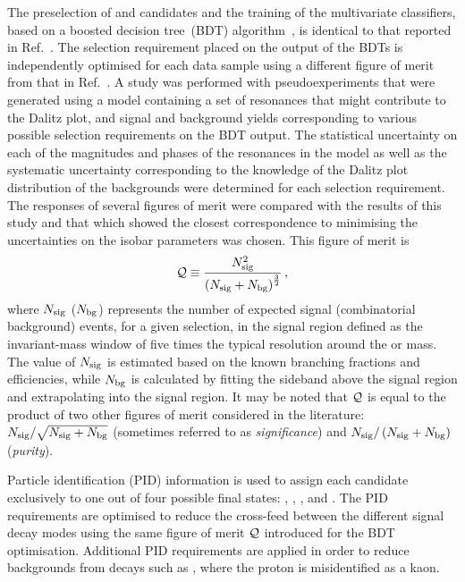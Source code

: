 The preselection of \KS and \B candidates and the training of the
multivariate classifiers, based on a boosted decision tree~(BDT)
algorithm~\cite{Breiman,AdaBoost}, is identical to that reported in
Ref.~\cite{LHCb-PAPER-2017-010}.
The selection requirement placed on the output of the BDTs is independently
optimised for each data sample using a different figure of merit from that in Ref.~\cite{LHCb-PAPER-2017-010}.
A study was performed with pseudoexperiments that were generated using a model containing a set of resonances that might contribute to the \BstoKsKPi Dalitz plot, and signal and background yields corresponding to various possible selection requirements on the BDT output.
The statistical uncertainty on each of the magnitudes and phases of the
resonances in the model as well as the systematic uncertainty
corresponding to the knowledge of the Dalitz plot distribution of the
backgrounds were determined for each selection requirement.
The responses of several figures of merit were compared with the results of
this study and that which showed the closest correspondence to minimising
the uncertainties on the isobar parameters was chosen.
This figure of merit is
%
\begin{equation}
{\cal Q} \equiv \frac{N^2_{\rm sig}}{\left(N_{\rm sig}+N_{\rm bg}\right)^\frac{3}{2}} \,,
\end{equation}
%
where $N_{\rm sig}$ ($N_{\rm bg}$) represents the number of expected signal
(combinatorial background) events, for a given selection, in the signal region
defined as the invariant-mass window of five times the typical resolution
around the \Bd or \Bs mass.
The value of $N_{\rm sig}$ is estimated based on the known branching
fractions and efficiencies, while $N_{\rm bg}$ is calculated by fitting the
sideband above the signal region and extrapolating into the signal region.
It may be noted that ${\cal Q}$ is equal to the product of two other figures of merit considered in the literature: $N_{\rm sig}/\sqrt{N_{\rm sig}+N_{\rm bg}}$ (sometimes referred to as {\it significance}) and $N_{\rm sig}/\left(N_{\rm sig}+N_{\rm bg}\right)$ ({\it purity}).

Particle identification (PID) information is used to assign
each candidate exclusively to one out of four possible final states:
\KsPiPi, \KsKpPim, \KsKmPip, and \KsKK.
The PID requirements are optimised to reduce the cross-feed between the
different signal decay modes using the same figure of merit ${\cal Q}$ introduced for the BDT optimisation. 
Additional PID requirements are applied in order to reduce backgrounds from
decays such as \LbtoKsPip, where the proton is misidentified as a kaon.

